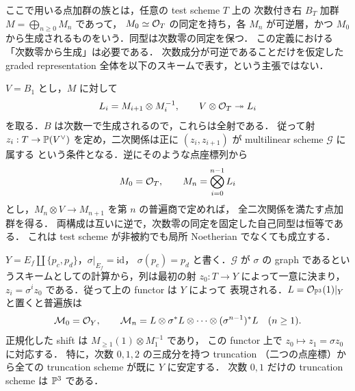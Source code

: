 \begin{remark}[点加群の族と任意基底における表現可能性]
\label{rem:qa-full-point-scheme-relative-functor}
ここで用いる点加群の族とは，任意の test scheme $T$ 上の
次数付き右 $B_T$ 加群 $M=\bigoplus_{n\ge0}M_n$ であって，
$M_0\simeq\mathcal O_T$ の同定を持ち，各 $M_n$ が可逆層，かつ
$M_0$ から生成されるものをいう．同型は次数零の同定を保つ．
この定義における「次数零から生成」は必要である．
次数成分が可逆であることだけを仮定した graded representation
全体を以下のスキームで表す，という主張ではない．

$V=B_1$ とし，$M$ に対して
\[
 L_i=M_{i+1}\otimes M_i^{-1},\qquad
 V\otimes\mathcal O_T\twoheadrightarrow L_i
\]
を取る．$B$ は次数一で生成されるので，これらは全射である．
従って射 $z_i:T\to\mathbb P(V^\vee)$ を定め，二次関係は正に
$(z_i,z_{i+1})$ が multilinear scheme $\mathcal G$ に属する
という条件となる．逆にそのような点座標列から
\[
 M_0=\mathcal O_T,\qquad M_n=\bigotimes_{i=0}^{n-1}L_i
\]
とし，$M_n\otimes V\to M_{n+1}$ を第 $n$ の普遍商で定めれば，
全二次関係を満たす点加群を得る．
両構成は互いに逆で，次数零の同定を固定した自己同型は恒等である．
これは test scheme が非被約でも局所 Noetherian でなくても成立する．

$Y=E_f\amalg\{p_c,p_d\}$，$\sigma|_{E_f}=\mathrm{id}$，
$\sigma(p_c)=p_d$ と書く．$\mathcal G$ が $\sigma$ の graph
であるというスキームとしての計算から，列は最初の射
$z_0:T\to Y$ によって一意に決まり，
$z_i=\sigma^i z_0$ である．従って上の functor は $Y$ によって
表現される．$L=\mathcal O_{\mathbb P^3}(1)|_Y$ と置くと普遍族は
\[
 \mathcal M_0=\mathcal O_Y,\qquad
 \mathcal M_n=L\otimes\sigma^*L\otimes\cdots
                 \otimes(\sigma^{n-1})^*L\quad(n\ge1).
\]
正規化した shift は $M_{\ge1}(1)\otimes M_1^{-1}$ であり，
この functor 上で $z_0\mapsto z_1=\sigma z_0$ に対応する．
特に，次数 $0,1,2$ の三成分を持つ truncation
（二つの点座標）から全ての truncation scheme が既に $Y$ に安定する．
次数 $0,1$ だけの truncation scheme は $\mathbb P^3$ である．
\end{remark}

